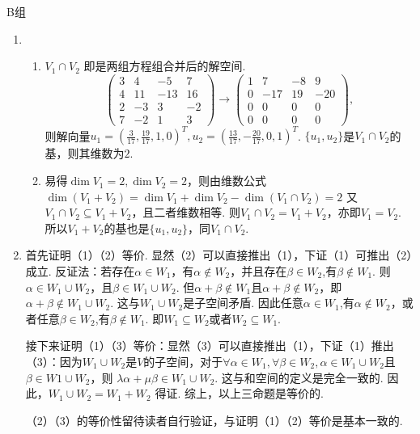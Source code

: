 \centerline{\heiti B组}
\begin{enumerate}
    \item \begin{enumerate}
        \item $V_1\cap V_2$ 即是两组方程组合并后的解空间.
        \[\begin{pmatrix}3&4&-5&7\\4&11&-13&16\\2&-3&3&-2\\7&-2&1&3\end{pmatrix}\rightarrow\begin{pmatrix}1&7&-8&9\\0&-17&19&-20\\0&0&0&0\\0&0&0&0\end{pmatrix},\]
        则解向量$u_1=(\frac 3{17},\frac{19}{17},1,0)^T,u_2=(\frac{13}{17},-\frac{20}{17},0,1)^T$.
        $\{u_1,u_2\}$是$V_1\cap V_2$的基，则其维数为$2$.
        \item 易得$\dim V_1=2,\dim V_2=2$，则由维数公式$\dim (V_1+V_2)=\dim V_1+\dim V_2-\dim (V_1\cap V_2)= 2$
        又$V_1\cap V_2\subseteq V_1+V_2$，且二者维数相等. 则$V_1\cap V_2=V_1+V_2$，亦即$V_1=V_2$. 所以$V_1+V_2$的基也是$\{u_1,u_2\}$，同$V_1\cap V_2$.
    \end{enumerate}

    \item 首先证明（1）（2）等价. 显然（2）可以直接推出（1），下证（1）可推出（2）成立. 反证法：若存在$\alpha\in W_1$，有$\alpha\not\in W_2$，并且存在$\beta \in W_2$,有$\beta \not\in W_1$. 则$\alpha\in W_1\cup W_2$，且$\beta \in W_1\cup W_2$. 但$\alpha+\beta \not\in W_1$且$\alpha+\beta \not\in W_2$，即$\alpha+\beta \not\in W_1\cup W_2$.
	这与$W_1\cup W_2$是子空间矛盾. 因此任意$\alpha\in W_1$,有$\alpha\not\in W_2$，或者任意$\beta \in W_2$,有$\beta\not\in W_1$. 即$W_1\subseteq W_2$或者$W_2\subseteq W_1$.

	接下来证明（1）（3）等价：显然（3）可以直接推出（1），下证（1）推出（3）：因为$W_1\cup W_2$是$V$的子空间，对于$\forall\alpha\in W_1,\forall	\beta \in W_2,\alpha\in W_1\cup W_2$且$\beta \in W1\cup W_2$，则 $\lambda\alpha+\mu\beta\in W_1\cup W_2$. 这与和空间的定义是完全一致的. 因此，$W_1\cup W_2=W_1+W_2$ 得证. 综上，以上三命题是等价的.

    （2）（3）的等价性留待读者自行验证，与证明（1）（2）等价是基本一致的.


\end{enumerate}
